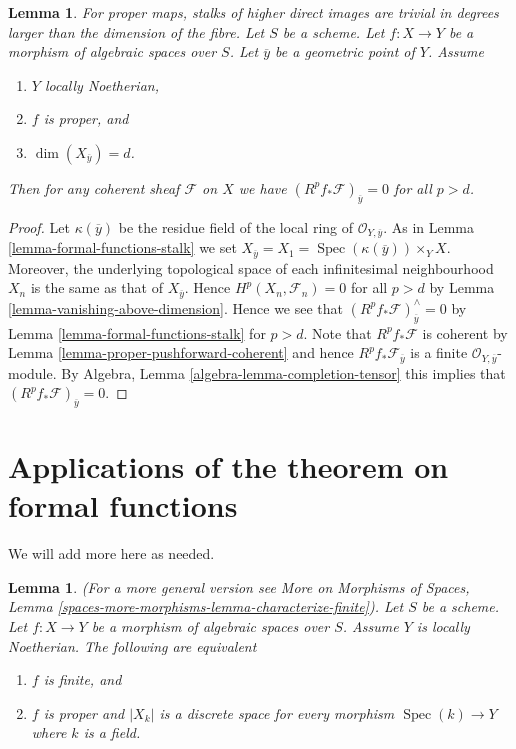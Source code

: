 \documentclass{stacks-project}
\newenvironment{slogan}{\comment}{\endcomment}
\theoremstyle{plain}
\newtheorem{lemma}[subsection]{Lemma}
\theoremstyle{definition}
\theoremstyle{remark}
\numberwithin{equation}{subsection}
\def\Spec{\mathop{\mathrm{Spec}}}
\begin{document}
\begin{lemma}
\label{lemma-higher-direct-images-zero-above-dimension-fibre}
\begin{slogan}
For proper maps, stalks of higher direct images are trivial in degrees
larger than the dimension of the fibre.
\end{slogan}
Let $S$ be a scheme.
Let $f : X \to Y$ be a morphism of algebraic spaces over $S$.
Let $\overline{y}$ be a geometric point of $Y$.
Assume
\begin{enumerate}
\item $Y$ locally Noetherian,
\item $f$ is proper, and
\item $\dim(X_{\overline{y}}) = d$.
\end{enumerate}
Then for any coherent sheaf $\mathcal{F}$ on $X$ we have
$(R^pf_*\mathcal{F})_{\overline{y}} = 0$ for all $p > d$.
\end{lemma}

\begin{proof}
Let $\kappa(\overline{y})$ be the residue field of the local
ring of $\mathcal{O}_{Y, \overline{y}}$. As in
Lemma \ref{lemma-formal-functions-stalk}
we set $X_{\overline{y}} = X_1 = \Spec(\kappa(\overline{y})) \times_Y X$.
Moreover, the underlying topological space of each infinitesimal
neighbourhood $X_n$ is the same as that of $X_{\overline{y}}$.
Hence $H^p(X_n, \mathcal{F}_n) = 0$ for all $p > d$ by
Lemma \ref{lemma-vanishing-above-dimension}.
Hence we see that $(R^pf_*\mathcal{F})_{\overline{y}}^\wedge = 0$
by Lemma \ref{lemma-formal-functions-stalk} for $p > d$.
Note that $R^pf_*\mathcal{F}$ is coherent by
Lemma \ref{lemma-proper-pushforward-coherent} and
hence $R^pf_*\mathcal{F}_{\overline{y}}$ is a finite
$\mathcal{O}_{Y, \overline{y}}$-module.
By Algebra, Lemma \ref{algebra-lemma-completion-tensor}
this implies that $(R^pf_*\mathcal{F})_{\overline{y}} = 0$.
\end{proof}






\section{Applications of the theorem on formal functions}
\label{section-applications-formal-functions}

\noindent
We will add more here as needed.

\begin{lemma}
\label{lemma-characterize-finite}
(For a more general version see
More on Morphisms of Spaces, Lemma
\ref{spaces-more-morphisms-lemma-characterize-finite}).
Let $S$ be a scheme.
Let $f : X \to Y$ be a morphism of algebraic spaces over $S$.
Assume $Y$ is locally Noetherian.
The following are equivalent
\begin{enumerate}
\item $f$ is finite, and
\item $f$ is proper and $|X_k|$ is a discrete space
for every morphism $\Spec(k) \to Y$ where $k$ is a field.
\end{enumerate}
\end{lemma}
\end{document}

